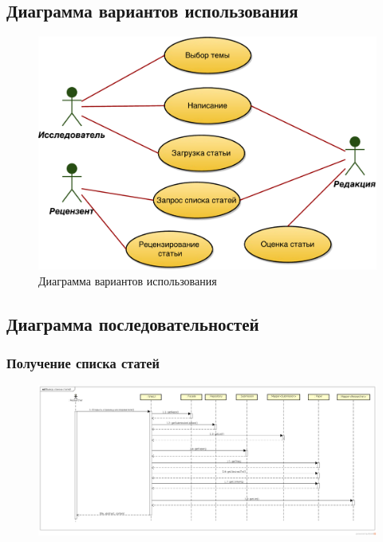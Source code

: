 \subsection{Диаграмма вариантов использования}

\begin{figure}[H]
\centering
\includegraphics[width=\textwidth]{../UseCases.pdf}
\caption{Диаграмма вариантов использования}
\end{figure}

\subsection{Диаграмма последовательностей}

\subsubsection{Получение списка статей}

\begin{figure}[H]
\centering
\includegraphics[width=\textwidth]{seq_papers.png}
\caption{}
\end{figure}


